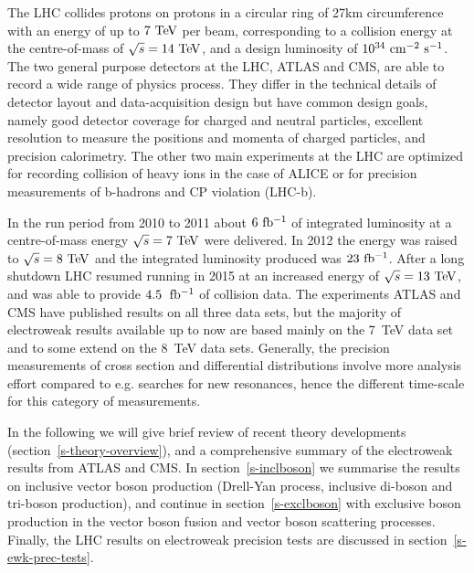 The LHC collides protons on protons in a circular ring of 27\;km 
circumference with an energy of up to $7\TeV$ per beam, corresponding
to a collision energy at the centre-of-mass of $\rts=14\TeV$, and a 
design luminosity of $10^{34}\cm^{-2}\s^{-1}$. 
The two general purpose detectors at the LHC, ATLAS and CMS, are able to
record a wide range of physics process. They differ in the technical details of detector
layout and data-acquisition design but have common design goals, namely 
good detector coverage for charged and neutral particles, excellent resolution to measure
the positions and momenta of charged particles, and precision calorimetry. The other two
main experiments at the LHC are optimized for recording collision of heavy ions in the 
case of ALICE or for precision measurements of b-hadrons and CP violation (LHC-b).

In the run period from 2010 to 2011 about $6\mbox{\ fb$^{-1}$}$ of integrated
luminosity at a centre-of-mass energy $\rts=7\TeV$ were delivered. In 
2012 the energy was raised to $\rts=8\TeV$ and the integrated luminosity 
produced was $23\mbox{\ fb$^{-1}$}$. 
After a long shutdown LHC resumed running in 2015 at an increased energy of
$\rts=13\TeV$, and was able to provide $4.5\;\mbox{\ fb$^{-1}$}$ of collision data.
The experiments ATLAS and CMS have published results on all three data sets,
but the majority of electroweak results available up to now are based mainly
on the 7~TeV data set and to some extend on the 8~TeV data sets. Generally, the precision
measurements of cross section and differential distributions involve more analysis
effort compared to e.g. searches for new resonances, hence the different
time-scale for this category of measurements. 






In the following we will give brief review 
of recent theory developments (section~\ref{s-theory-overview}), and a comprehensive
summary of the electroweak results from ATLAS and CMS. In section~\ref{s-inclboson} we summarise the
results on inclusive vector boson production (Drell-Yan process, inclusive di-boson and tri-boson production), 
and continue in section~\ref{s-exclboson} with exclusive boson production in the vector boson fusion and vector 
boson scattering processes. Finally, the LHC results on electroweak precision tests are discussed 
in section~\ref{s-ewk-prec-tests}. 


